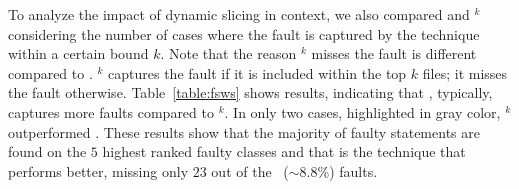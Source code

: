 \documentclass{article}
\begin{document}
To analyze the impact of dynamic slicing in context, we also compared
 and \sfl{}$^{k}$ considering the number of cases where the
fault is captured by the technique within a certain bound $k$. Note
that the reason \sfl{}$^{k}$ misses the fault is different compared to
. \sfl{}$^{k}$ captures the fault if it is included within
the top $k$ files; it misses the fault
otherwise. Table~\ref{table:fsws} shows results, indicating that
, typically, captures more faults compared to
\sfl{}$^{k}$. In only two cases, highlighted in gray color,
\sfl{}$^{k}$ outperformed . These results show that the
majority of faulty statements are found on the $5$ highest ranked
faulty classes and that  is the technique
that performs better, missing only $23$ out of the
\numFaults\ ($\sim$8.8\%) faults.


\end{document}

